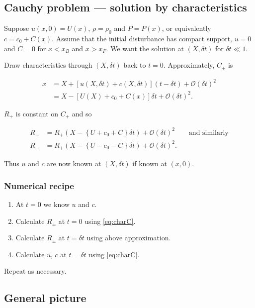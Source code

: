 \documentclass{notes}
\newcommand{\cO}{\mathcal{O}}
\begin{document}
\subsection[Cauchy problem]{Cauchy problem --- solution by characteristics}

Suppose $u(x,0) = U(x)$, $\rho = \rho_0$ and $P = P(x)$, or equivalently
$c = c_0 + C(x)$.  Assume that the initial disturbance has compact
support, $u=0$ and $C = 0$ for $x < x_B$ and $x > x_F$.  We want
the solution at $(X,\delta t)$ for $\delta t \ll 1$.

\vspace{1in}

Draw characteristics through $(X,\delta t)$ back to $t=0$.  Approximately,
$C_+$ is

\begin{align*}
x &= X + \left[ u(X,\delta t) + c(X,\delta t) \right] (t-\delta t)
+ \cO(\delta t)^2 \\
&=  X - \left[ U(X) + c_0 + C(x) \right] \delta t + \cO(\delta t)^2.
\end{align*}

$R_+$ is constant on $C_+$ and so

\begin{align*}
R_+ &= R_+\left(X - \left\{U + c_0 + C \right\} \delta t \right) +
\cO(\delta t)^2 \qquad \text{and similarly} \\
R_- &= R_+\left(X - \left\{U - c_0 - C \right\} \delta t \right) +
\cO(\delta t)^2.
\end{align*}

Thus $u$ and $c$ are now known at $(X,\delta t)$ if known at
$(x,0)$.

\subsubsection*{Numerical recipe}

\begin{enumerate}
\item At $t=0$ we know $u$ and $c$.
\item Calculate $R_\pm$ at $t=0$ using \eqref{eq:charC}.
\item Calculate $R_\pm$ at $t = \delta t$ using above approximation.
\item Calculate $u$, $c$ at $t = \delta t$ using \eqref{eq:charC}.
\end{enumerate}

Repeat as necessary.

\subsection{General picture}
\end{document}
